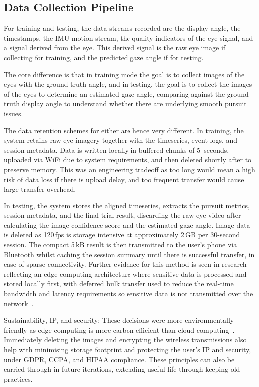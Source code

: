 \subsection{Data Collection Pipeline}

For training and testing, the data streams recorded are the display angle, the timestamps, the IMU motion stream, the quality indicators of the eye signal, and a signal derived from the eye. This derived signal is the raw eye image if collecting for training, and the predicted gaze angle if for testing.

The core difference is that in training mode the goal is to collect images of the eyes with the ground truth angle, and in testing, the goal is to collect the images of the eyes to determine an estimated gaze angle, comparing against the ground truth display angle to understand whether there are underlying smooth pursuit issues.

The data retention schemes for either are hence very different. In training, the system retains raw eye imagery together with the timeseries, event logs, and session metadata. Data is written locally in buffered chunks of 5~seconds, uploaded via WiFi due to system requirements, and then deleted shortly after to preserve memory. This was an engineering tradeoff as too long would mean a high risk of data loss if there is upload delay, and too frequent transfer would cause large transfer overhead.

In testing, the system stores the aligned timeseries, extracts the pursuit metrics, session metadata, and the final trial result, discarding the raw eye video after calculating the image confidence score and the estimated gaze angle. Image data is deleted as 120\,fps is storage intensive at approximately 2\,GB per 30-second session. The compact 5\,kB result is then transmitted to the user's phone via Bluetooth whilst caching the session summary until there is successful transfer, in case of sparse connectivity. Further evidence for this method is seen in research reflecting an edge-computing architecture where sensitive data is processed and stored locally first, with deferred bulk transfer used to reduce the real-time bandwidth and latency requirements so sensitive data is not transmitted over the network~\cite{rancea2024edge}.

Sustainability, IP, and security: These decisions were more environmentally friendly as edge computing is more carbon efficient than cloud computing~\cite{ma2025greening}. Immediately deleting the images and encrypting the wireless transmissions also help with minimising storage footprint and protecting the user's IP and security, under GDPR, CCPA, and HIPAA compliance. These principles can also be carried through in future iterations, extending useful life through keeping old practices.

